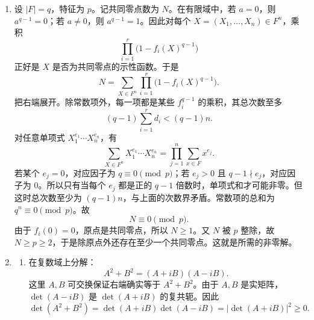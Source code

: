 \documentclass[UTF8,12pt]{ctexart}
\begin{document}
\begin{enumerate}[label=\textbf{\arabic*.},leftmargin=2.2em]
\begin{enumerate}[label=\textbf{(\alph*)},leftmargin=2.4em]
\item 设 \(\varphi:S\to T\) 为同构，并令
\[
\Delta_\varphi=\{(s,\varphi(s)):s\in S\}\subset S\times T.
\]
它显然不包含 \(S\times1\) 或 \(1\times T\)。若 \(M\) 是包含 \(\Delta_\varphi\) 的一个极大真子群，则 \(M\) 也不可能包含任一直因子；例如若 \(S\times1\subset M\)，则
\[
(1,\varphi(s))=(s,1)^{-1}(s,\varphi(s))\in M
\]
对所有 \(s\) 成立，于是 \(1\times T\subset M\)，从而 \(M=G\)，矛盾。因此 \(G\) 有不含任一直因子的极大真子群。

\item 设 \(M<G\) 是极大真子群，且不包含 \(S\times1\) 与 \(1\times T\)。若 \(\pi_S(M)\ne S\)，则 \(\pi_S(M)=1\)，于是 \(M\subset1\times T\)，这会导致 \(M\) 可被更大的真子群 \(1\times T\) 包含，除非 \(M=1\times T\)，但这又包含一个直因子，与假设矛盾。因此 \(\pi_S(M)=S\)。同理 \(\pi_T(M)=T\)。

令
\[
M_S=M\cap(S\times1),\qquad M_T=M\cap(1\times T).
\]
它们分别对应 \(S,T\) 的正规子群。由于 \(M\) 不包含任一直因子，故 \(M_S=M_T=1\)。于是每个 \(s\in S\) 在 \(M\) 中有唯一的 \(t\in T\) 与之配对，因而 \(M\) 是某个同态 \(\varphi:S\to T\) 的图像。投影到 \(T\) 也满，所以 \(\varphi\) 满；核是 \(S\) 的正规子群，而 \(M_S=1\) 给出核为 \(1\)。因此 \(\varphi\) 是同构，故 \(S\simeq T\)。
\end{enumerate}

\item 设 \(|F|=q\)，特征为 \(p\)。记共同零点数为 \(N\)。在有限域中，若 \(a=0\)，则 \(a^{q-1}=0\)；若 \(a\ne0\)，则 \(a^{q-1}=1\)。因此对每个 \(X=(X_1,\ldots,X_n)\in F^n\)，乘积
\[
\prod_{i=1}^r\bigl(1-f_i(X)^{q-1}\bigr)
\]
正好是 \(X\) 是否为共同零点的示性函数。于是
\[
N=\sum_{X\in F^n}\prod_{i=1}^r\bigl(1-f_i(X)^{q-1}\bigr).
\]
把右端展开。除常数项外，每一项都是某些 \(f_i^{q-1}\) 的乘积，其总次数至多
\[
(q-1)\sum_{i=1}^r d_i<(q-1)n.
\]
对任意单项式 \(X_1^{e_1}\cdots X_n^{e_n}\)，有
\[
\sum_{X\in F^n}X_1^{e_1}\cdots X_n^{e_n}
=\prod_{j=1}^n\sum_{x\in F}x^{e_j}.
\]
若某个 \(e_j=0\)，对应因子为 \(q\equiv0\pmod p\)；若 \(e_j>0\) 且 \(q-1\nmid e_j\)，对应因子为 \(0\)。所以只有当每个 \(e_j\) 都是正的 \(q-1\) 倍数时，单项式和才可能非零。但这时总次数至少为 \((q-1)n\)，与上面的次数界矛盾。常数项的总和为 \(q^n\equiv0\pmod p\)。故
\[
N\equiv0\pmod p.
\]
由于 \(f_i(0)=0\)，原点是共同零点，所以 \(N\ge1\)。又 \(N\) 被 \(p\) 整除，故 \(N\ge p\ge2\)，于是除原点外还存在至少一个共同零点。这就是所需的非零解。

\item
\begin{enumerate}[label=\textbf{(\alph*)},leftmargin=2.4em]
\item 在复数域上分解：
\[
A^2+B^2=(A+iB)(A-iB).
\]
这里 \(A,B\) 可交换保证右端确实等于 \(A^2+B^2\)。由于 \(A,B\) 是实矩阵，\(\det(A-iB)\) 是 \(\det(A+iB)\) 的复共轭。因此
\[
\det(A^2+B^2)
=\det(A+iB)\det(A-iB)
=|\det(A+iB)|^2\ge0.
\]


\end{enumerate}
\end{enumerate}
\end{document}
